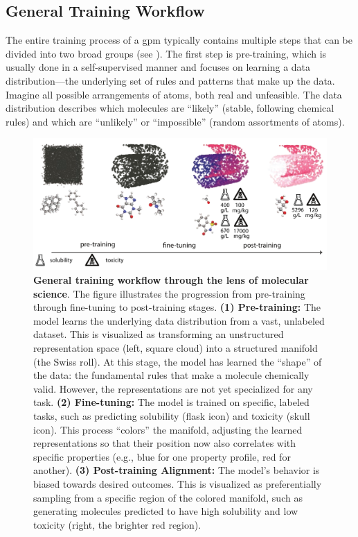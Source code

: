 \subsection{General Training Workflow}

The entire training process of a \gls{gpm} typically contains multiple steps that can be divided into two broad groups (see ). \autocite{howard2018universal} 
The first step is pre-training, which is usually done in a self-supervised manner and focuses on learning a data distribution---the underlying set of rules and patterns that make up the data. 
Imagine all possible arrangements of atoms, both real and unfeasible. 
The data distribution describes which molecules are \enquote{likely} (stable, following chemical rules) and which are \enquote{unlikely} or \enquote{impossible} (random assortments of atoms).


\begin{figure}[!ht]
    \centering
    \includegraphics[width=1\textwidth]{figures/rescaled_figures/chemrev_figure4.pdf}
    \caption{\textbf{General training workflow through the lens of molecular science}. The figure illustrates the progression from pre-training through fine-tuning to post-training stages.  \textbf{(1) Pre-training:} The model learns the underlying data distribution from a vast, unlabeled dataset. This is visualized as transforming an unstructured representation space (left, square cloud) into a structured manifold (the Swiss roll). At this stage, the model has learned the \enquote{shape} of the data: the fundamental rules that make a molecule chemically valid. However, the representations are not yet specialized for any task. 
    \textbf{(2) Fine-tuning:} The model is trained on specific, labeled tasks, such as predicting solubility (flask icon) and toxicity (skull icon). This process \enquote{colors} the manifold, adjusting the learned representations so that their position now also correlates with specific properties (e.g., blue for one property profile, red for another). 
    \textbf{(3) Post-training Alignment:} The model's behavior is biased towards desired outcomes. This is visualized as preferentially sampling from a specific region of the colored manifold, such as generating molecules predicted to have high solubility and low toxicity (right, the brighter red region).}
    \label{fig:training_workflow}
\end{figure}


